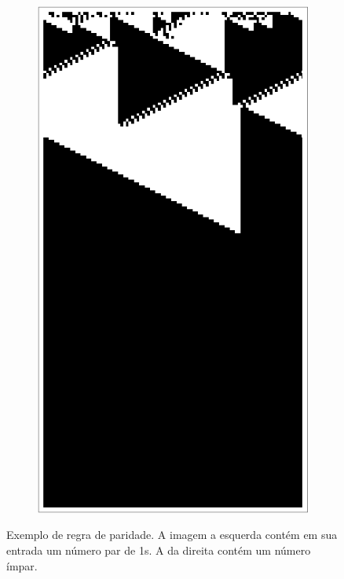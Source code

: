 \documentclass[aspectratio=43]{beamer}
\begin{document}
\begin{frame}
\begin{figure}
\begin{subfigure}{0.20\textwidth}
        \end{subfigure}
        ~
        \setcounter{subfigure}{0}
        \begin{subfigure}{0.20\textwidth}
            \includegraphics[width=\linewidth]{regra-1-impar.png}
        \end{subfigure}

        \label{fig:parity-rule}
        \caption{Exemplo de regra de paridade. A imagem a esquerda contém em sua entrada um número par de 1s. A da direita contém um número ímpar.}
    \end{figure}
\end{frame}
\end{document}
